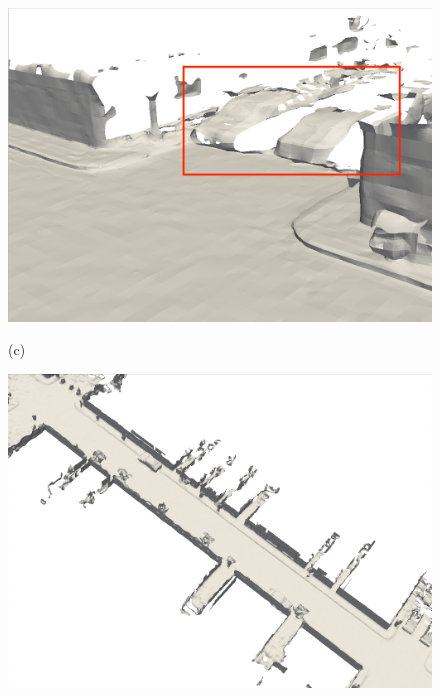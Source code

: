 \begin{figure}[htbp]
\begin{minipage}{0.322\linewidth}
\end{minipage}\hfill
\begin{minipage}{0.322\linewidth}
    \centering
    \includegraphics[width=1\linewidth]{figures/mai_2_bce.png}
\end{minipage}\vfill
(c)
\begin{minipage}{0.322\linewidth}
    \centering
    \includegraphics[width=1\linewidth]{figures/mai_3_shine.png}
    \end{minipage}\hfill
    \begin{minipage}{0.322\linewidth}
    \centering

\end{minipage}
\end{figure}
